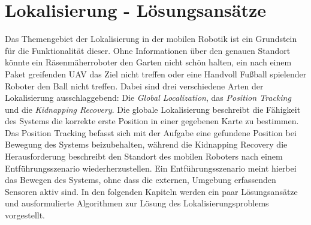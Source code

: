 \chapter{\textbf{Lokalisierung - Lösungsansätze}}\label{chap:Lokalisierung - Lösungsansätze}
Das Themengebiet der Lokalisierung in der mobilen Robotik ist ein Grundstein für die Funktionalität dieser. Ohne Informationen über den genauen Standort könnte ein Räsenmäherroboter den Garten nicht schön halten, ein nach einem Paket greifenden UAV das Ziel nicht treffen oder eine Handvoll Fußball spielender Roboter den Ball nicht treffen. Dabei sind drei verschiedene Arten der Lokalisierung ausschlaggebend: Die \textit{Global Localization}, das \textit{Position Tracking} und die \textit{Kidnapping Recovery}. Die globale Lokalisierung beschreibt die Fähigkeit des Systems die korrekte erste Position in einer gegebenen Karte zu bestimmen. Das Position Tracking befasst sich mit der Aufgabe eine gefundene Position bei Bewegung des Systems beizubehalten, während die Kidnapping Recovery die Herausforderung beschreibt den Standort des mobilen Roboters nach einem Entführungsszenario wiederherzustellen. Ein Entführungsszenario meint hierbei das Bewegen des Systems, ohne dass die externen, Umgebung erfassenden Sensoren aktiv sind. In den folgenden Kapiteln werden ein paar Lösungsansätze und ausformulierte Algorithmen zur Lösung des Lokalisierungsproblems vorgestellt.

